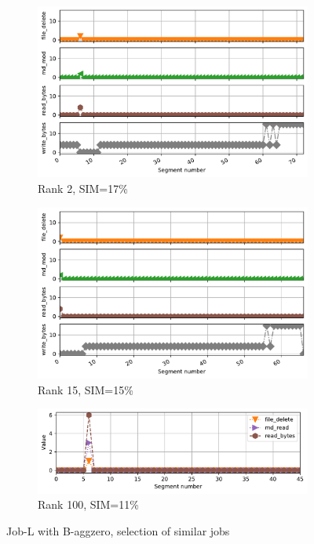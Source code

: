 \documentclass{jhps}
\begin{document}
\begin{figure}[bt]
\begin{subfigure}{0.3\textwidth}
\centering
\includegraphics[width=\textwidth]{job_similarities_7488914-out/bin_aggzeros-0.1671--1timeseries7869050}
\caption{Rank 2, SIM=17\%}
\end{subfigure}
\begin{subfigure}{0.3\textwidth}
\includegraphics[width=\textwidth]{job_similarities_7488914-out/bin_aggzeros-0.1521--14timeseries8363584}
\caption{Rank 15, SIM=15\%}
\end{subfigure}
\begin{subfigure}{0.3\textwidth}
\centering
\includegraphics[width=\textwidth]{job_similarities_7488914-out/bin_aggzeros-0.1097--97timeseries4262983}
\caption{Rank 100, SIM=11\%}
\end{subfigure}

\caption{Job-L with B-aggzero, selection of similar jobs}%
\label{fig:job-L-bin-aggzero}
\end{figure}
\end{document}
